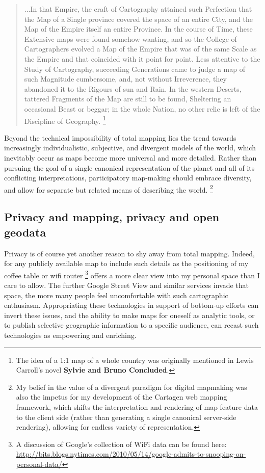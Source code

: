 \documentclass[11pt]{report}
\begin{document}
\begin{quote}
...In that Empire, the craft of Cartography attained such Perfection that the Map of a Single province covered the space of an entire City, and the Map of the Empire itself an entire Province. In the course of Time, these Extensive maps were found somehow wanting, and so the College of Cartographers evolved a Map of the Empire that was of the same Scale as the Empire and that coincided with it point for point. Less attentive to the Study of Cartography, succeeding Generations came to judge a map of such Magnitude cumbersome, and, not without Irreverence, they abandoned it to the Rigours of sun and Rain. In the western Deserts, tattered Fragments of the Map are still to be found, Sheltering an occasional Beast or beggar; in the whole Nation, no other relic is left of the Discipline of Geography.
\cite{borges1946exactitude} \footnote{The idea of a 1:1 map of a whole country was originally mentioned in Lewis Carroll's novel \textbf{Sylvie and Bruno Concluded}.} 
\end{quote}

Beyond the technical impossibility of total mapping lies the trend towards increasingly individualistic, subjective, and divergent models of the world, which inevitably occur as maps become more universal and more detailed. Rather than pursuing the goal of a single canonical representation of the planet and all of its conflicting interpretations, participatory map-making should embrace diversity, and allow for separate but related means of describing the world. \footnote{My belief in the value of a divergent paradigm for digital mapmaking was also the impetus for my development of the Cartagen web mapping framework, which shifts the interpretation and rendering of map feature data to the client side (rather than generating a single canonical server-side rendering), allowing for endless variety of representation.} 

\subsection{Privacy and mapping, privacy and open geodata}

Privacy is of course yet another reason to shy away from total mapping. Indeed, for any publicly available map to include such details as the positioning of my coffee table or wifi router \footnote{A discussion of Google's collection of WiFi data can be found here: \url{http://bits.blogs.nytimes.com/2010/05/14/google-admits-to-snooping-on-personal-data/}} offers a more clear view into my personal space than I care to allow. The further Google Street View and similar services invade that space, the more many people feel uncomfortable with such cartographic enthusiasm. Appropriating these technologies in support of bottom-up efforts can invert these issues, and the ability to make maps for oneself as analytic tools, or to publish selective geographic information to a specific audience, can recast such technologies as empowering and enriching.  
\end{document}
